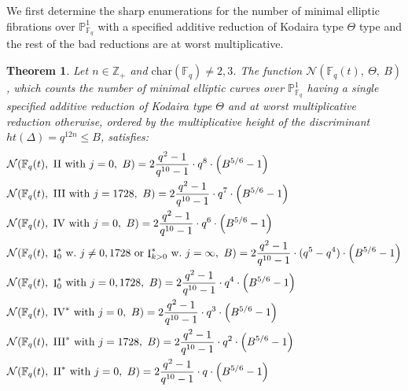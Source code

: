 \documentclass[a4paper,12pt]{amsart}
\newtheorem{thm}{Theorem}[section]
\theoremstyle{definition}
\newcommand{\I}{{\mathop{\rm I}}}
\newcommand{\II}{{\mathop{\rm II}}}
\newcommand{\III}{{\mathop{\rm III}}}
\newcommand{\IV}{{\mathop{\rm IV}}}
\newcommand{\Nc}{\mathcal{N}}
\newcommand{\Pb}{\mathbb{P}}
\newcommand{\Fb}{\mathbb{F}}
\begin{document}
	
	\medskip
	
	We first determine the sharp enumerations for the number of minimal elliptic fibrations over $\Pb^1_{\Fb_q}$ with a specified additive reduction of Kodaira type $\Theta$ type and the rest of the bad reductions are at worst multiplicative. 
	
	
	
	\begin{thm}\label{thm:ell_curve_count_2}
		Let $n \in \mathbb{Z}_{+}$ and $\text{char} (\Fb_q) \neq 2,3$. The function $\Nc(\Fb_q(t),~\Theta,~B)$, which counts the number of minimal elliptic curves over $\Pb^1_{\Fb_q}$ having a single specified additive reduction of Kodaira type $\Theta$ and at worst multiplicative reduction otherwise, ordered by the multiplicative height of the discriminant $ht(\Delta) = q^{12n} \le B$, satisfies:     
		\begingroup
		\allowdisplaybreaks
		\begin{align*}
			&\Nc(\Fb_q(t),~\II~\mathrm{with}~j=0,~B) = 2\frac{q^2 - 1}{ q^{10} - 1} \cdot q^8 \cdot \left( B^{5/6} - 1\right) \\
			&\Nc(\Fb_q(t),~\III~\mathrm{with}~j=1728,~B) = 2\frac{q^2 - 1}{ q^{10} - 1} \cdot q^7 \cdot \left( B^{5/6} - 1\right) \\
			&\Nc(\Fb_q(t),~\IV~\mathrm{with}~j=0,~B) = 2\frac{q^2 - 1}{ q^{10} - 1} \cdot q^6 \cdot \left( B^{5/6} - 1\right) \\
			&\Nc(\Fb_q(t),~\I_0^*~\mathrm{w.}~j \neq 0,1728~\mathrm{or}~ \I_{k > 0}^*~\mathrm{w.}~j=\infty,~B) = 2\frac{q^2 - 1}{ q^{10} - 1} \cdot (q^5 - q^4) \cdot \left( B^{5/6} - 1\right) \\
			&\Nc(\Fb_q(t),~\I_0^*~\mathrm{with}~j=0, 1728,~B) = 2\frac{q^2 - 1 }{q^{10}-1 } \cdot q^4 \cdot \left( B^{5/6} - 1\right) \\
			&\Nc(\Fb_q(t),~\IV^*~\mathrm{with}~j=0,~B) = 2\frac{q^2 - 1}{ q^{10} - 1} \cdot q^3 \cdot \left( B^{5/6} - 1\right) \\
			&\Nc(\Fb_q(t),~\III^*~\mathrm{with}~j=1728,~B) = 2\frac{q^2 - 1}{ q^{10} - 1} \cdot q^2 \cdot \left( B^{5/6} - 1\right) \\
			&\Nc(\Fb_q(t),~\II^*~\mathrm{with}~j=0,~B) = 2\frac{q^2 - 1}{ q^{10} - 1} \cdot q \cdot \left( B^{5/6} - 1\right) \\
		\end{align*}
		\endgroup
	\end{thm} 
	
\end{document}
